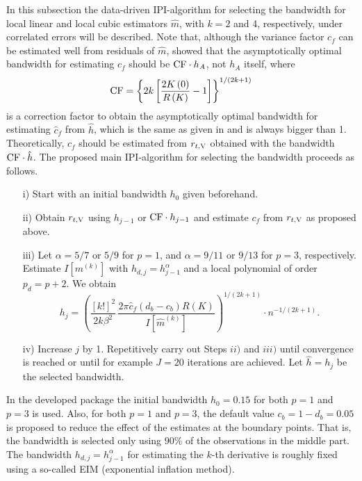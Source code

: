 In this subsection the data-driven IPI-algorithm for selecting the bandwidth for local linear and local cubic estimators $\hat m$, with $k=2$ and 4, respectively, under correlated errors will be described. 
Note that, although the variance factor $c_{f}$ can be estimated well from residuals of $\hat m$,
\citet{fenggriesfritz2020} showed that the asymptotically optimal bandwidth for estimating $c_{f}$ should be ${\rm CF}\cdot h_A$, not $h_A$ itself, where  
\begin{equation}\label{eq:CF}
{\rm CF}= \left\{2k\left[\frac{2 K\left(0\right)}{R\left(K\right)}- 1\right]\right\}^{1/\left(2k+1\right)}
\end{equation}
is a correction factor to obtain the asymptotically optimal bandwidth for estimating $\hat c_f$ from $\hat h$, which is the same as given in \citet{feng2009simple} and is always bigger than 1. 
Theoretically, $c_{f}$ should be estimated from $r_{t, {\rm V}}$ obtained with the bandwidth ${\rm CF}\cdot \hat h$.
The proposed main IPI-algorithm for selecting the bandwidth proceeds as follows.      
\begin{enumerate}
	\item[\enspace\enspace i)] Start with an initial bandwidth $h_0$ given beforehand.
	
	\item[\enspace ii)] Obtain $r_{t, {\rm V}}$ using $h_{j-1}$ or ${\rm CF}\cdot h_{j-1}$ and estimate $c_f$ from $r_{t, {\rm V}}$ as proposed above. 
	
	\item[iii)] Let $\alpha=5/7$ or $5/9$ for $p=1$, and $\alpha=9/11$ or $9/13$ for $p=3$, respectively. Estimate $I\left[m^{\left(k\right)}\right]$ with $h_{d,j}=h_{j-1}^{\alpha}$ and a local polynomial of order $p_d=p+2$. We obtain 
	\begin{equation}\label{eq:bi}
	h_j=\left(\frac{\left[k!\right]^2}{2k \beta^2} \, \frac{2\pi \hat
		c_f \left(d_b -c_b\right) R\left(K\right)}{I\left[\hat m^{\left(k\right)}\right]}\right)^{1/\left(2k+1\right)} \cdot
	n^{-1/\left(2k+1\right)}. 
	\end{equation}	
	\item[\enspace iv)] Increase $j$ by 1. Repetitively carry out Steps $ii)$ and $iii)$ until convergence is reached or until for example $J=20$ iterations are achieved. Let $\hat h=h_{j}$ be the selected bandwidth.
\end{enumerate}
In the developed package the initial bandwidth $h_0=0.15$ for both $p=1$ and $p=3$ is used. 
Also, for both $p=1$ and $p=3$, the default value $c_b=1-d_b=0.05$ is proposed to reduce the effect of the estimates at the boundary points. That is, the bandwidth is selected only using $90\%$ of the observations in the middle part. The bandwidth $h_{d,j}=h_{j-1}^{\alpha}$ for estimating the $k$-th derivative is roughly fixed using a so-called EIM (exponential inflation method). 
